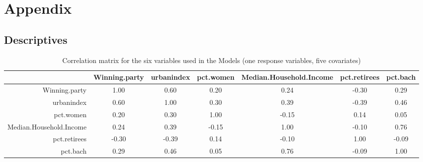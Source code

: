 \documentclass[12pt]{article}
\begin{document}
\section*{Appendix}


\subsection*{Descriptives}

\begin{table}[h]
	\centering
	\caption{Correlation matrix for the six variables used in the Models (one response variables, five covariates)}
	\label{}
	\begin{adjustbox}{max width=\textwidth}
	\begin{tabular}{rcccccc}
		\hline
		& Winning.party & urbanindex & pct.women & Median.Household.Income & pct.retirees & pct.bach \\ 
		\hline
		Winning.party & 1.00 & 0.60 & 0.20 & 0.24 & -0.30 & 0.29 \\ 
		urbanindex & 0.60 & 1.00 & 0.30 & 0.39 & -0.39 & 0.46 \\ 
		pct.women & 0.20 & 0.30 & 1.00 & -0.15 & 0.14 & 0.05 \\ 
		Median.Household.Income & 0.24 & 0.39 & -0.15 & 1.00 & -0.10 & 0.76 \\ 
		pct.retirees & -0.30 & -0.39 & 0.14 & -0.10 & 1.00 & -0.09 \\ 
		pct.bach & 0.29 & 0.46 & 0.05 & 0.76 & -0.09 & 1.00 \\ 
		\hline
	\end{tabular}
	\end{adjustbox}
\end{table}

\end{document}

